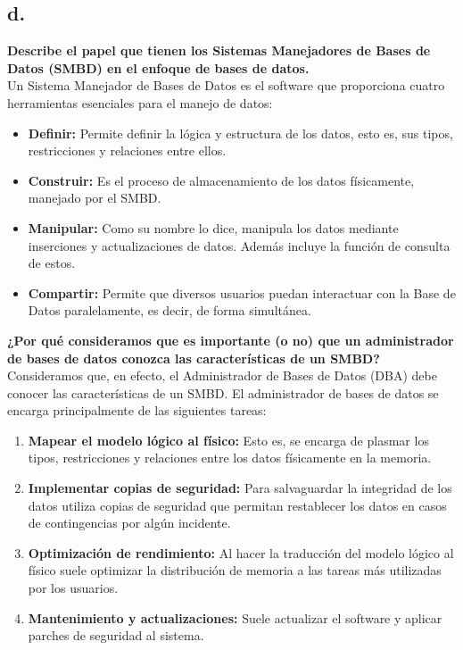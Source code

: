 
\subsection*{d.}

\textbf{Describe el papel que tienen los Sistemas Manejadores de Bases de Datos (SMBD) en el enfoque de bases de datos.}\\
Un Sistema Manejador de Bases de Datos es el software que proporciona cuatro herramientas esenciales para el manejo de datos:
\begin{itemize}
    \item \textbf{Definir:} Permite definir la lógica y estructura de los datos, esto es, sus tipos, restricciones y relaciones entre ellos.
    
    \item \textbf{Construir:} Es el proceso de almacenamiento de los datos físicamente, manejado por el SMBD.
    
    \item \textbf{Manipular:} Como su nombre lo dice, manipula los datos mediante inserciones y actualizaciones de datos. Además incluye la función de consulta de estos.

    \item \textbf{Compartir:} Permite que diversos usuarios puedan interactuar con la Base de Datos paralelamente, es decir, de forma simultánea. \\
    
\end{itemize}

\textbf{¿Por qué consideramos que es importante (o no) que un administrador de bases de datos conozca las características de un SMBD?}\\

Consideramos que, en efecto, el Administrador de Bases de Datos (DBA) debe conocer las características de un SMBD.
El administrador de bases de datos se encarga principalmente de las siguientes tareas:
\begin{enumerate}
    \item \textbf{Mapear el modelo lógico al físico:} Esto es, se encarga de plasmar los tipos, restricciones y relaciones entre los datos físicamente en la memoria.
    \item \textbf{Implementar copias de seguridad:} Para salvaguardar la integridad de los datos utiliza copias de seguridad que permitan restablecer los datos en casos de contingencias por algún incidente.
    \item \textbf{Optimización de rendimiento:} Al hacer la traducción del modelo lógico al físico suele optimizar la distribución de memoria a las tareas más utilizadas por los usuarios.
    \item \textbf{Mantenimiento y actualizaciones:} Suele actualizar el software y aplicar parches de seguridad al sistema.
\end{enumerate}

